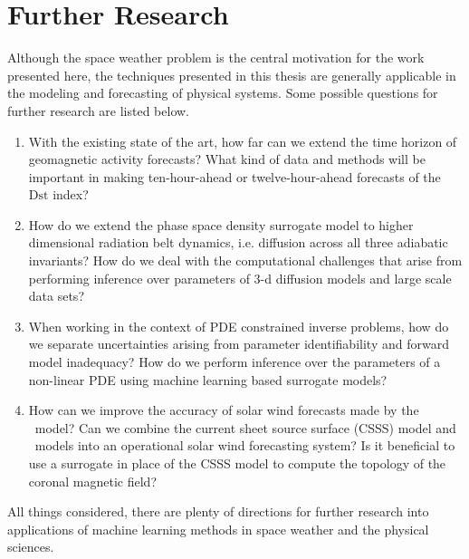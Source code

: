 \section{Further Research}

Although the space weather problem is the central motivation for the work 
presented here, the techniques presented in this thesis are generally 
applicable in the modeling and forecasting of physical systems. Some possible 
questions for further research are listed below.
%
\begin{enumerate}
    \item With the existing state of the art, how far can we extend the time 
          horizon of geomagnetic activity forecasts? What kind of data and 
          methods will be important in making ten-hour-ahead or 
          twelve-hour-ahead forecasts of the $\mathrm{Dst}$ index?
    \item How do we extend the phase space density surrogate model to higher 
          dimensional radiation belt dynamics, i.e. diffusion across all three 
          adiabatic invariants? How do we deal with the computational 
          challenges that arise from performing inference over parameters of 
          $3$-d diffusion models and large scale data sets? 
    \item When working in the context of PDE constrained inverse problems, how 
          do we separate uncertainties arising from parameter identifiability 
          and forward model inadequacy? How do we perform inference over the 
          parameters of a non-linear PDE using machine learning based 
          surrogate models?
    \item How can we improve the accuracy of solar wind forecasts made by the 
          \XX \ model? Can we combine the current sheet source surface (CSSS) 
          model and \XX \ models into an operational solar wind forecasting 
          system? Is it beneficial to use a surrogate in place of the CSSS 
          model to compute the topology of the coronal magnetic field? 
\end{enumerate}
%
All things considered, there are plenty of directions for further research into 
applications of machine learning methods in space weather and the physical 
sciences.
